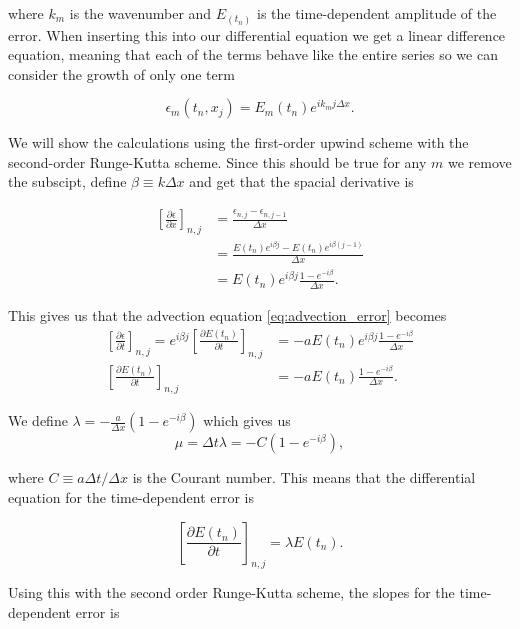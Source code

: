 \documentclass{article}
\begin{document}
where $k_m$ is the wavenumber and $E_(t_n)$ is the time-dependent amplitude of the error. When inserting this into our differential equation we get a linear difference equation, meaning that each of the terms behave like the entire series so we can consider the growth of only one term

\begin{equation}
    \epsilon_m(t_n,x_j) = E_m(t_n) e^{i k_m j\Delta x}.
\end{equation}

We will show the calculations using the first-order upwind scheme with the second-order Runge-Kutta scheme. Since this should be true for any $m$ we remove the subscipt, define $\beta\equiv k\Delta x$ and get that the spacial derivative is

\begin{align*}
    \left[\frac{\partial \epsilon}{\partial x}\right]_{n,j} &= \frac{\epsilon_{n,j}-\epsilon_{n,j-1}}{\Delta x}\\
    &= \frac{E(t_n) e^{i \beta j}- E(t_n) e^{i \beta (j-1)}}{\Delta x}\\
    &= E(t_n)e^{i\beta j} \frac{1-e^{-i\beta}}{\Delta x}.
\end{align*}

This gives us that the advection equation \ref{eq:advection_error} becomes
\begin{align}
    \left[\frac{\partial \epsilon}{\partial t}\right]_{n,j} = e^{i\beta j}\left[\frac{\partial E(t_n)}{\partial t}\right]_{n,j} &= -a E(t_n)e^{i\beta j} \frac{1-e^{-i\beta}}{\Delta x}\\
    \left[\frac{\partial E(t_n)}{\partial t}\right]_{n,j} &= -a E(t_n)\frac{1-e^{-i\beta}}{\Delta x}.
\end{align}

We define $\lambda= - \frac{a}{\Delta x}\left( 1-e^{-i\beta} \right)$ which gives us 
\begin{equation}
    \mu = \Delta t \lambda = - C\left( 1-e^{-i\beta} \right),
\end{equation}

where $C\equiv a\Delta t/\Delta x$ is the Courant number. This means that the differential equation for the time-dependent error is

\begin{equation}
    \left[\frac{\partial E(t_n)}{\partial t}\right]_{n,j} = \lambda E(t_n).
\end{equation}

Using this with the second order Runge-Kutta scheme, the slopes for the time-dependent error is
\end{document}
